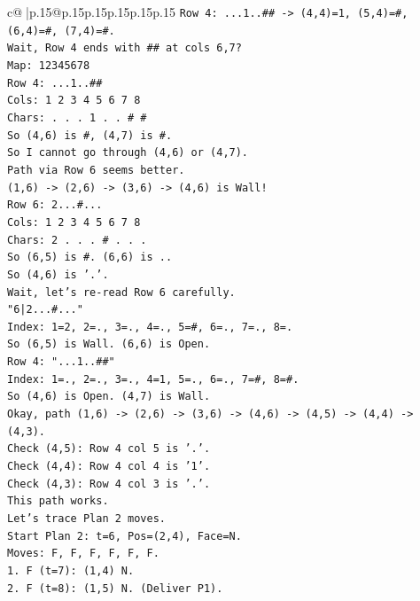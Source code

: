 \documentclass{article}
\begin{document}
{\begin{supertabular}{c@{$\;$}|p{.15\linewidth}@{}p{.15\linewidth}p{.15\linewidth}p{.15\linewidth}p{.15\linewidth}p{.15\linewidth}}
{{{\texttt{Row 4: ...1..\#\# {-}> (4,4)=1, (5,4)=\#, (6,4)=\#, (7,4)=\#.} \\
\texttt{Wait, Row 4 ends with \#\# at cols 6,7?} \\
\texttt{Map: 12345678} \\
\texttt{Row 4: ...1..\#\#} \\
\texttt{Cols: 1 2 3 4 5 6 7 8} \\
\texttt{Chars: . . . 1 . . \# \#} \\
\texttt{So (4,6) is \#, (4,7) is \#.} \\
\texttt{So I cannot go through (4,6) or (4,7).} \\
\texttt{Path via Row 6 seems better.} \\
\texttt{(1,6) {-}> (2,6) {-}> (3,6) {-}> (4,6) is Wall!} \\
\texttt{Row 6: 2...\#...} \\
\texttt{Cols: 1 2 3 4 5 6 7 8} \\
\texttt{Chars: 2 . . . \# . . .} \\
\texttt{So (6,5) is \#. (6,6) is ..} \\
\texttt{So (4,6) is '.'.} \\
\texttt{Wait, let's re{-}read Row 6 carefully.} \\
\texttt{"6|2...\#..."} \\
\texttt{Index: 1=2, 2=., 3=., 4=., 5=\#, 6=., 7=., 8=.} \\
\texttt{So (6,5) is Wall. (6,6) is Open.} \\
\texttt{Row 4: "...1..\#\#"} \\
\texttt{Index: 1=., 2=., 3=., 4=1, 5=., 6=., 7=\#, 8=\#.} \\
\texttt{So (4,6) is Open. (4,7) is Wall.} \\
\texttt{Okay, path (1,6) {-}> (2,6) {-}> (3,6) {-}> (4,6) {-}> (4,5) {-}> (4,4) {-}> (4,3).} \\
\texttt{Check (4,5): Row 4 col 5 is '.'.} \\
\texttt{Check (4,4): Row 4 col 4 is '1'.} \\
\texttt{Check (4,3): Row 4 col 3 is '.'.} \\
\texttt{This path works.} \\
\texttt{Let's trace Plan 2 moves.} \\
\texttt{Start Plan 2: t=6, Pos=(2,4), Face=N.} \\
\texttt{Moves: F, F, F, F, F, F.} \\
\texttt{1. F (t=7): (1,4) N.} \\
\texttt{2. F (t=8): (1,5) N. (Deliver P1).} \\
}}}
\end{supertabular}}
\end{document}
